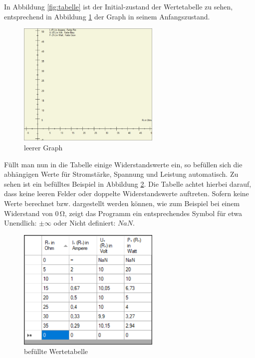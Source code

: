 \documentclass[a4paper]{article}
\begin{document}
    In Abbildung \ref{fig:tabelle} ist der Initial-zustand der Wertetabelle zu sehen, entsprechend in Abbildung \ref{fig:graph} der Graph in seinem Anfangszustand.
    \begin{figure}[!h]
        \begin{center}
            \includegraphics[width=6.8cm]{img/graph}
            \caption{leerer Graph}
            \label{fig:graph}
        \end{center}
    \end{figure}

    Füllt man nun in die Tabelle einige Widerstandswerte ein, so befüllen sich die abhängigen Werte für Stromstärke, Spannung und Leistung automatisch.
    Zu sehen ist ein befülltes Beispiel in Abbildung \ref{fig:tabellebefuellt}.
    Die Tabelle achtet hierbei darauf, dass keine leeren Felder oder doppelte Widerstandswerte auftreten.
    Sofern keine Werte berechnet bzw. dargestellt werden können, wie zum Beispiel bei einem Widerstand von $0\,\si{\ohm}$, zeigt das Programm ein entsprechendes Symbol für etwa \glqq Unendlich\grqq{}: $\pm\infty$ oder \glqq Nicht definiert\grqq{}: $NaN$.
    \begin{figure}[!h]
        \begin{center}
            \includegraphics[width=6.8cm]{img/tabellebefuellt}
            \caption{befüllte Wertetabelle}
            \label{fig:tabellebefuellt}
        \end{center}
    \end{figure}
\end{document}
